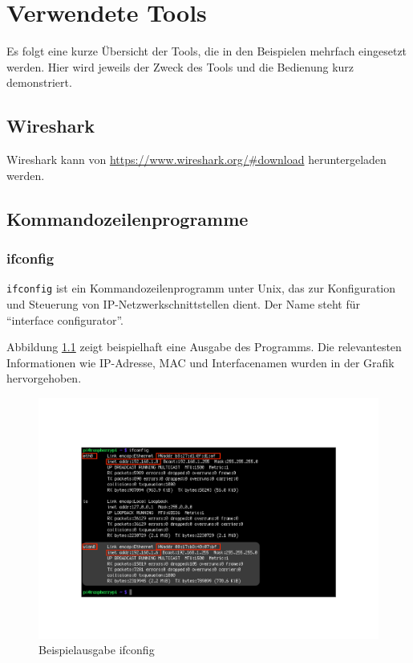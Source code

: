 \chapter{Verwendete Tools}
Es folgt eine kurze Übersicht der Tools, die in den Beispielen mehrfach eingesetzt werden. Hier wird jeweils der Zweck des Tools und die Bedienung kurz demonstriert.

\section{Wireshark}

Wireshark kann von \url{https://www.wireshark.org/#download} heruntergeladen werden.

\section{Kommandozeilenprogramme}
\subsection{ifconfig}

\colorbox{altgray}{\lstinline|ifconfig|} ist ein Kommandozeilenprogramm unter Unix, das zur Konfiguration und Steuerung von IP-Netzwerkschnittstellen dient. Der Name steht für \enquote{interface configurator}.

Abbildung \ref{img:ifconfig} zeigt beispielhaft eine Ausgabe des Programms. Die relevantesten Informationen wie IP-Adresse, MAC und Interfacenamen wurden in der Grafik hervorgehoben.

\begin{figure}[H]
	\centering
	\includegraphics[width=1\textwidth]{images/ifconfig.pdf}
	\caption{Beispielausgabe ifconfig}
	\label{img:ifconfig}
\end{figure}

